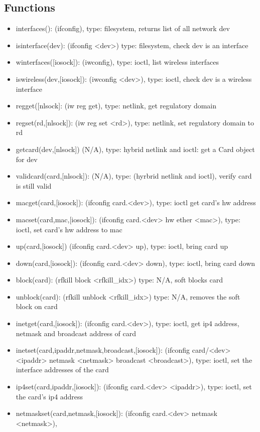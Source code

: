 \documentclass[11pt]{article}
\begin{document}
\begin{appendices}
\subsection{Functions}
\begin{itemize}
\item interfaces(): (ifconfig), type: filesystem, returns list of all network dev
\item isinterface(dev): (ifconfig <dev>) type: filesystem, check dev is an interface
\item winterfaces([iosock]): (iwconfig), type: ioctl, list wireless interfaces
\item iswireless(dev,[iosock]): (iwconfig <dev>), type: ioctl, check dev is a 
wireless interface
\item regget([nlsock]: (iw reg get), type: netlink, get regulatory domain
\item regset(rd,[nlsock]): (iw reg set <rd>), type: netlink, set regulatory domain 
to rd
\item getcard(dev,[nlsock]) (N/A), type: hybrid netlink and ioctl: get a Card 
object for dev
\item validcard(card,[nlsock]): (N/A), type: (hyrbrid netlink and ioctl), verify
card is still valid
\item macget(card,[iosock]): (ifconfig card.<dev>), type: ioctl get card's hw
address
\item macset(card,mac,[iosock]): (ifconfig card.<dev> hw ether <mac>), type: 
ioctl, set card's hw address to mac
\item up(card,[iosock]) (ifconfig card.<dev> up), type: ioctl, bring card up
\item down(card,[iosock]): (ifconfig card.<dev> down), type: ioctl, bring card 
down
\item block(card): (rfkill block <rfkill\_idx>) type: N/A, soft blocks card
\item unblock(card): (rfkill unblock <rfkill\_idx>) type: N/A, removes the soft 
block on card
\item inetget(card,[iosock]): (ifconfig card.<dev>), type: ioctl, get ip4 address,
netmask and broadcast address of card
\item inetset(card,ipaddr,netmask,broadcast,[iosock]): (ifconfig card/<dev> <ipaddr>
netmask <netmask> broadcast <broadcast>), type: ioctl, set the interface addresses
of the card
\item ip4set(card,ipaddr,[iosock]): (ifconfig card.<dev> <ipaddr>), type: ioctl,
set the card's ip4 address
\item netmaskset(card,netmask,[iosock]): (ifconfig card.<dev> netmask <netmask>), 

\end{itemize}
\end{appendices}
\end{document}
